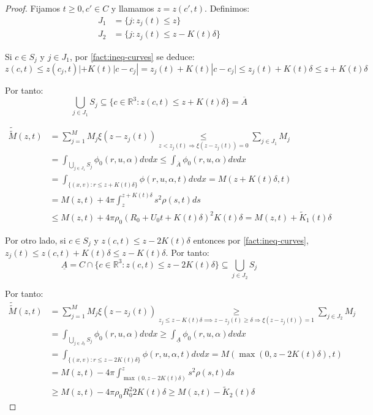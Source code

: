 \documentclass[a4paper,10pt]{scrartcl}
\theoremstyle{definition}
\newcommand{\ktilde}{\widetilde{K}}
\newcommand{\dtilde}[1]{\widetilde{\widetilde{#1}}}
\numberwithin{equation}{section}
\begin{document}
\begin{proof}
 Fijamos $t \ge 0, c'\in C$ y llamamos $z = z(c',t)$. Definimos:
 \begin{align*}
 J_1 &= \{j: z_j(t) \le z\}\\
 J_2 &= \{j: z_j(t) \le z - K(t)\delta\}
 \end{align*}
 
 Si $c\in S_j$ y $j\in J_1$, por \cref{fact:ineq-curves} se deduce:
 \[
    z(c,t) \le z(c_j,t)| + K(t)|c - c_j| = z_j(t) + K(t) |c - c_j| \le z_j(t) + K(t)\delta \le z + K(t) \delta
 \]
 
 Por tanto:
 \[
    \bigcup_{j\in J_1} S_j \subseteq \{c \in \mathbb{R}^3: z(c,t) \le z + K(t) \delta\} = \overline{A}
 \]
 
 
 \begin{align*}
 \dtilde{M}(z,t) &= \sum_{j = 1}^M M_j \xi(z - z_j(t)) \underset{z <      
 z_j(t) \Rightarrow \xi(z - z_j(t)) = 0}{\le} \sum_{j \in J_1} M_j\\
  &= \int_{\bigcup_{j\in J_1} S_j} \phi_0(r,u,\alpha) dv dx \le \int_{\overline{A}} \phi_0(r,u,\alpha) dv dx\\
  &= \int_{\{(x,v):r \le z + K(t)\delta\}} \phi(r,u,\alpha,t) dv dx = M(z + K(t)\delta, t)\\
  & = M(z,t) + 4\pi \int_{z}^{z+K(t)\delta} s^2 \rho(s,t) ds \\ 
  &\le M(z,t) + 4\pi \rho_0 (R_0 + U_0t + K(t) \delta)^2 K(t) \delta = M(z, t) + \ktilde_1(t) \delta
 \end{align*}

 Por otro lado, si $c \in S_j$ y $z(c,t) \le z - 2K(t) \delta$ entonces por \cref{fact:ineq-curves}, $z_j(t) \le z(c,t) + K(t) \delta \le z - K(t) \delta$. Por tanto:
 \[
  \underline{A} = C \cap \{c\in \mathbb{R}^3:z(c,t) \le z - 2K(t) \delta\} \subseteq \bigcup_{j\in J_2} S_j
 \]
 
 Por tanto:
 \begin{align*}
 \dtilde{M}(z,t) &= \sum_{j = 1}^M M_j \xi(z - z_j(t)) \underset{z_j \le z - K(t)\delta \implies z - z_j(t) \ge \delta \Rightarrow \xi(z - z_j(t)) = 1}{\ge} \sum_{j \in J_2} M_j\\
  &= \int_{\bigcup_{j\in J_2} S_j} \phi_0(r,u,\alpha) dv dx \ge \int_{\underline{A}} \phi_0(r,u,\alpha) dv dx\\
  &= \int_{\{(x,v):r \le z - 2K(t)\delta\}} \phi(r,u,\alpha,t) dv dx = M(\max(0,z-2K(t)\delta), t)\\
  & = M(z,t) - 4\pi \int_{\max(0,z-2K(t)\delta)}^z  s^2 \rho(s,t) ds \\ 
  &\ge M(z,t) - 4\pi \rho_0 R_0^2 2K(t)\delta \ge M(z, t) - \ktilde_2(t) \delta
 \end{align*}
 

\end{proof}
\end{document}
